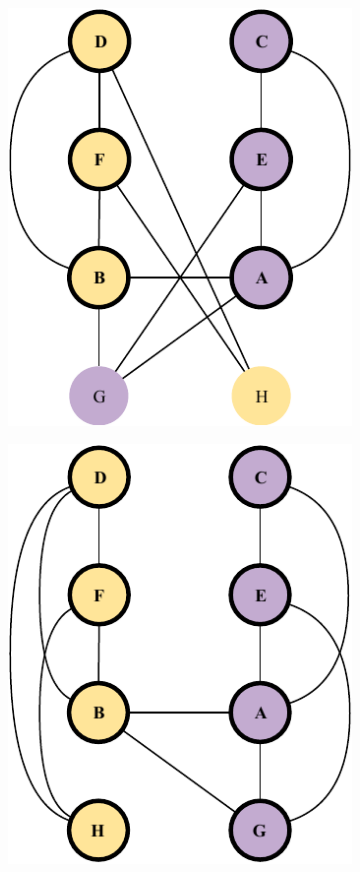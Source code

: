 \documentclass[a4paper, 10pt]{article}
\begin{document}
\begin{figure}[H]
\begin{subfigure}{0.19\textwidth}
        \includegraphics[width=1\linewidth]{5_24.pdf}
    \end{subfigure}
    \hfill
    \begin{subfigure}{0.19\textwidth}
        \centering
        \includegraphics[width=1\linewidth]{5_25.pdf}

\end{subfigure}
\end{figure}
\end{document}
